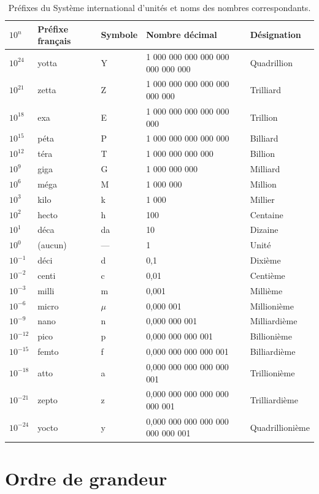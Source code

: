 \documentclass[a4paper,12pt]{book}
\begin{document}
\begin{table}
\begin{tabular}{|l|l|l|l|l|}
\hline
$10^n$&Préfixe français&Symbole&Nombre décimal&Désignation\\
\hline\hline
$10^{24}$&yotta&Y&1 000 000 000 000 000 000 000 000&Quadrillion\\
\hline
$10^{21}$&zetta&Z&1 000 000 000 000 000 000 000&Trilliard\\
\hline
$10^{18}$&exa&E&1 000 000 000 000 000 000&Trillion\\
\hline
$10^{15}$&péta&P&1 000 000 000 000 000&Billiard\\
\hline
$10^{12}$&téra&T&1 000 000 000 000&Billion\\
\hline
$10^{9}$&giga&G&1 000 000 000&Milliard\\
\hline
$10^{6}$&méga&M&1 000 000&Million\\
\hline
$10^{3}$&kilo&k&1 000&Millier\\
\hline
$10^{2}$&hecto&h&100&Centaine\\
\hline
$10^{1}$&déca&da&10&Dizaine\\
\hline
$10^{0}$&(aucun)&—&1&Unité\\
\hline
$10^{-1}$&déci&d&0,1&Dixième\\
\hline
$10^{-2}$&centi&c&0,01&Centième\\
\hline
$10^{-3}$&milli&m&0,001&Millième\\
\hline
$10^{-6}$&micro&$\mu$&0,000 001&Millionième\\
\hline
$10^{-9}$&nano&n&0,000 000 001&Milliardième\\
\hline
$10^{-12}$&pico&p&0,000 000 000 001&Billionième\\
\hline
$10^{-15}$&femto&f&0,000 000 000 000 001&Billiardième\\
\hline
$10^{-18}$&atto&a&0,000 000 000 000 000 001&Trillionième\\
\hline
$10^{-21}$&zepto&z&0,000 000 000 000 000 000 001&Trilliardième\\
\hline
$10^{-24}$&yocto&y&0,000 000 000 000 000 000 000 001&Quadrillionième\\
\hline
\end{tabular}
\caption{Préfixes du Système international d'unités et noms des nombres correspondants.}
\label{table_prefixe}
\end{table}

\section{Ordre de grandeur}
\end{document}
